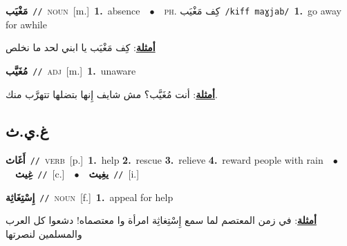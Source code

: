 \documentclass[10pt,a4paper,twoside]{article} %
\begin{document}
\begin{multicols}{2}
{\setlength\topsep{0pt}\textbf{\foreignlanguage{arabic}{مَغْيَب}}\ {\color{gray}\texttt{//}\color{black}}\ \textsc{noun}\ [m.]\ \textbf{1.}~absence\ \ $\bullet$\ \ \textsc{ph.} \color{gray} \foreignlanguage{arabic}{كِف مَغْيَب}\color{black}\ {\color{gray}\texttt{/{\sffamily kiff maɣjab}/}\color{black}}\ \textbf{1.}~go away for awhile\  \begin{flushright}\color{gray}\foreignlanguage{arabic}{\textbf{\underline{\foreignlanguage{arabic}{أمثلة}}}: كِف مَغْيَب يا ابني لحد ما نخلص}\end{flushright}\color{black}} \vspace{2mm}

{\setlength\topsep{0pt}\textbf{\foreignlanguage{arabic}{مُغَيَّب}}\ {\color{gray}\texttt{//}\color{black}}\ \textsc{adj}\ [m.]\ \textbf{1.}~unaware\  \begin{flushright}\color{gray}\foreignlanguage{arabic}{\textbf{\underline{\foreignlanguage{arabic}{أمثلة}}}: أنت مُغَيَّب؟ مش شايف إِنها بتضلها تتهرَّب منك.}\end{flushright}\color{black}} \vspace{2mm}

\vspace{-3mm}
\subsection*{\color{blue}\foreignlanguage{arabic}{غ.ي.ث}\color{blue}{}} 

{\setlength\topsep{0pt}\textbf{\foreignlanguage{arabic}{أَغَاث}}\ {\color{gray}\texttt{//}\color{black}}\ \textsc{verb}\ [p.]\ \textbf{1.}~help  \textbf{2.}~rescue  \textbf{3.}~relieve  \textbf{4.}~reward people with rain\ \ $\bullet$\ \ \setlength\topsep{0pt}\textbf{\foreignlanguage{arabic}{غِيث}}\ {\color{gray}\texttt{//}\color{black}}\ [c.]\ \ $\bullet$\ \ \setlength\topsep{0pt}\textbf{\foreignlanguage{arabic}{يغِيث}}\ {\color{gray}\texttt{//}\color{black}}\ [i.]\ } \vspace{2mm}

{\setlength\topsep{0pt}\textbf{\foreignlanguage{arabic}{إِسْتِغَاثِة}}\ {\color{gray}\texttt{//}\color{black}}\ \textsc{noun}\ [f.]\ \textbf{1.}~appeal for help\  \begin{flushright}\color{gray}\foreignlanguage{arabic}{\textbf{\underline{\foreignlanguage{arabic}{أمثلة}}}: في زمن المعتصم لما سمع إِسْتِغاثِة امرأة وا معتصماه! دشعوا كل العرب والمسلمين لنصرتها}\end{flushright}\color{black}} \vspace{2mm}


\end{multicols}
\end{document}
